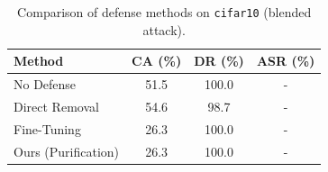 \begin{table}[htbp]
\centering
\caption{Comparison of defense methods on \texttt{cifar10} (blended attack).}
\label{tab:results}
\begin{tabular}{lccc}
\toprule
Method & CA (\%) & DR (\%) & ASR (\%) \\
\midrule
  No Defense & 51.5 & 100.0 & - \\
  Direct Removal & 54.6 & 98.7 & - \\
  Fine-Tuning & 26.3 & 100.0 & - \\
  Ours (Purification) & 26.3 & 100.0 & - \\
\bottomrule
\end{tabular}
\end{table}